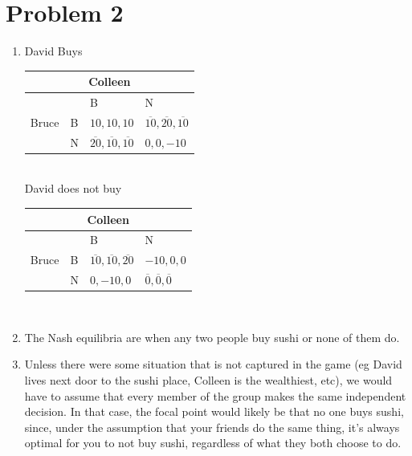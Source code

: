 \documentclass[letterpaper]{article}
\begin{document}
\section{Problem 2}
\begin{enumerate}
    \item 
David Buys \\
\begin{tabular}{|l|l|l|l|}
\multicolumn{4}{c}{Colleen}                      \\ \hline
\multirow{3}{*}{Bruce} &   & B        & N        \\ \hline
                       & B & $10,10,10$ & $\overline{10},\overline{20},\overline{10}$ \\ \hline
                       & N & $\overline{20},\overline{10},\overline{10}$ & $0,0,-10$ \\ \hline
\end{tabular} \\
David does not buy \\
\begin{tabular}{|l|l|l|l|}
\multicolumn{4}{c}{Colleen}                      \\ \hline
\multirow{3}{*}{Bruce} &   & B        & N        \\ \hline
                       & B & $\overline{10},\overline{10},\overline{20}$ & $-10,0,0$  \\ \hline
                       & N & $0,-10,0$ & $\overline{0},\overline{0},\overline{0}$ \\ \hline
\end{tabular}\\

\item The Nash equilibria are when any two people buy sushi or none of them do.  
\item Unless there were some situation that is not captured in the game (eg David lives next door to the sushi place, Colleen is the wealthiest, etc), we would have to assume that every member of the group makes the same independent decision. In that case, the focal point would likely be that no one buys sushi, since, under the assumption that your friends do the same thing, it's always optimal for you to not buy sushi, regardless of what they both choose to do.
\end{enumerate}
\end{document}
